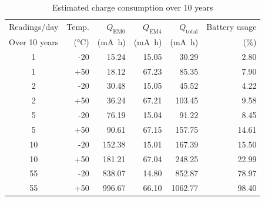 \begin{table}[H]
\centering
\caption{Estimated charge consumption over 10 years}
\label{tab:charge_10y}
\begin{tabular}{@{}crrrrr@{}}
\toprule
Readings/day &
Temp. &
$Q_{\mathrm{EM0}}$ &
$Q_{\mathrm{EM4}}$ &
$Q_{\mathrm{total}}$ &
Battery usage \\
Over 10 years  &
(\si{\celsius}) &
(\si{\milli\ampere\hour}) &
(\si{\milli\ampere\hour}) &
(\si{\milli\ampere\hour}) &
(\%) \\
\midrule
1  & -20 & 15.24  & 15.05 & 30.29   & 2.80 \\
1  & +50 & 18.12  & 67.23 & 85.35   & 7.90 \\
\hline
2  & -20 & 30.48  & 15.05 & 45.52   & 4.22 \\
2  & +50 & 36.24  & 67.21 & 103.45  & 9.58 \\
\hline
5  & -20 & 76.19  & 15.04 & 91.22   & 8.45 \\
5  & +50 & 90.61  & 67.15 & 157.75  & 14.61 \\
\hline
10 & -20 & 152.38 & 15.01 & 167.39  & 15.50 \\
10 & +50 & 181.21 & 67.04 & 248.25  & 22.99 \\
\hline
55 & -20 & 838.07 & 14.80 & 852.87  & 78.97 \\
55 & +50 & 996.67 & 66.10 & 1062.77 & 98.40 \\
\bottomrule
\end{tabular}
\end{table}

